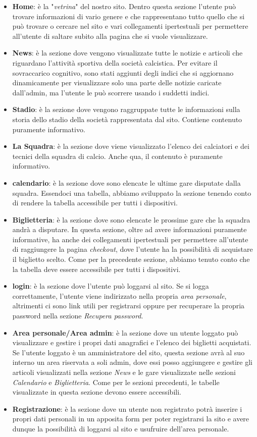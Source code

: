 \documentclass[12pt, a4paper]{article}
\begin{document}
\begin{itemize}
	\item \textbf{Home}: è la "\textit{vetrina}" del nostro sito. Dentro questa sezione l'utente può trovare informazioni di vario genere e che rappresentano tutto quello che si può trovare o
	cercare nel sito e vari collegamenti ipertestuali per permettere all'utente di saltare subito alla pagina che si vuole visualizzare.
	\item \textbf{News}: è la sezione dove vengono visualizzate tutte le notizie e articoli che riguardano l'attività sportiva della società calcistica. Per evitare il sovraccarico cognitivo, sono stati aggiunti degli indici
	che si aggiornano dinamicamente per visualizzare solo una parte delle notizie caricate dall'admin, ma l'utente le può scorrere usando i suddetti indici.
	\item \textbf{Stadio}: è la sezione dove vengono raggruppate tutte le informazioni sulla storia dello stadio della società rappresentata dal sito. Contiene contenuto puramente informativo.
	\item \textbf{La Squadra}: è la sezione dove viene visualizzato l'elenco dei calciatori e dei tecnici della squadra di calcio. Anche qua, il contenuto è puramente informativo.
	\item \textbf{calendario}: è la sezione dove sono elencate le ultime gare disputate dalla squadra. Essendoci una tabella, abbiamo sviluppato la sezione tenendo conto di rendere la tabella accessibile per tutti i dispositivi.
	\item \textbf{Biglietteria}: è la sezione dove sono elencate le prossime gare che la squadra andrà a disputare. In questa sezione, oltre ad avere informazioni puramente informative, ha anche dei collegamenti ipertestuali per 
	permettere all'utente di raggiungere la pagina \textit{checkout}, dove l'utente ha la possibilità di acquistare il biglietto scelto. Come per la precedente sezione, abbiamo tenuto conto che la tabella deve essere accessibile
	per tutti i dispositivi.
	\item \textbf{login}: è la sezione dove l'utente può loggarsi al sito. Se si logga correttamente, l'utente viene indirizzato nella propria \textit{area personale}, altrimenti ci sono link utili per registrarsi oppure per 
	recuperare la propria password nella sezione \textit{Recupera password}.
	\item \textbf{Area personale/Area admin}: è la sezione dove un utente loggato può visualizzare e gestire i propri dati anagrafici e l'elenco dei biglietti acquistati. Se l'utente loggato è un amministratore del sito, questa sezione
	avrà al suo interno un area riservata a soli admin, dove essi posso aggiungere e gestire gli articoli visualizzati nella sezione \textit{News} e le gare visualizzate nelle sezioni \textit{Calendario} e \textit{Biglietteria}.
	Come per le sezioni precedenti, le tabelle visualizzate in questa sezione devono essere accessibili.
	\item \textbf{Registrazione}: è la sezione dove un utente non registrato potrà inserire i propri dati personali in un apposita form per poter registrarsi la sito e avere dunque la possibilità di loggarsi al sito e usufruire
	dell'area personale.
\end{itemize}
\end{document}
